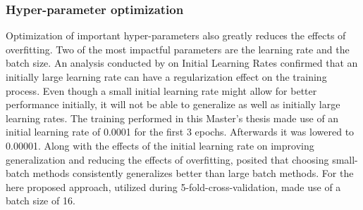 \subsubsection{Hyper-parameter optimization}
Optimization of important hyper-parameters also greatly reduces the effects of overfitting. Two of the most impactful parameters are the learning rate and the batch size.
\newline\newline
An analysis conducted by \citet{Yuanzhi:2019:RegularizationInitialLargeLearningRate} on Initial Learning Rates confirmed that an initially large learning rate can have a regularization effect on the training process. Even though a small initial learning rate might allow for better performance initially, it will not be able to generalize as well as initially large learning rates. The training performed in this Master's thesis made use of an initial learning rate of 0.0001 for the first 3 epochs. Afterwards it was lowered to 0.00001.
\newline\newline
Along with the effects of the initial learning rate on improving generalization and reducing the effects of overfitting, \citet{Keskar:2016:LargeBatchTrainingGeneralization} posited that choosing small-batch methods consistently generalizes better than large batch methods. For the here proposed approach, utilized during 5-fold-cross-validation, made use of a batch size of 16.
